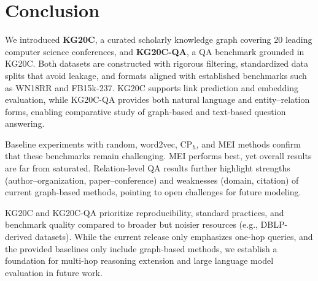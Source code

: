 \documentclass[conference]{IEEEtran}
\begin{document}
%
%


\section{Conclusion} \label{sect:conclusion}

We introduced \textbf{KG20C}, a curated scholarly knowledge graph covering 20 leading computer science conferences, and \textbf{KG20C-QA}, a QA benchmark grounded in KG20C. Both datasets are constructed with rigorous filtering, standardized data splits that avoid leakage, and formats aligned with established benchmarks such as WN18RR and FB15k-237. KG20C supports link prediction and embedding evaluation, while KG20C-QA provides both natural language and entity--relation forms, enabling comparative study of graph-based and text-based question answering.

Baseline experiments with random, word2vec, CP$_h$, and MEI methods confirm that these benchmarks remain challenging. MEI performs best, yet overall results are far from saturated. Relation-level QA results further highlight strengths (author--organization, paper--conference) and weaknesses (domain, citation) of current graph-based methods, pointing to open challenges for future modeling.

KG20C and KG20C-QA prioritize reproducibility, standard practices, and benchmark quality compared to broader but noisier resources (e.g., DBLP-derived datasets). While the current release only emphasizes one-hop queries, and the provided baselines only include graph-based methods, we establish a foundation for multi-hop reasoning extension and large language model evaluation in future work.





%

\end{document}
